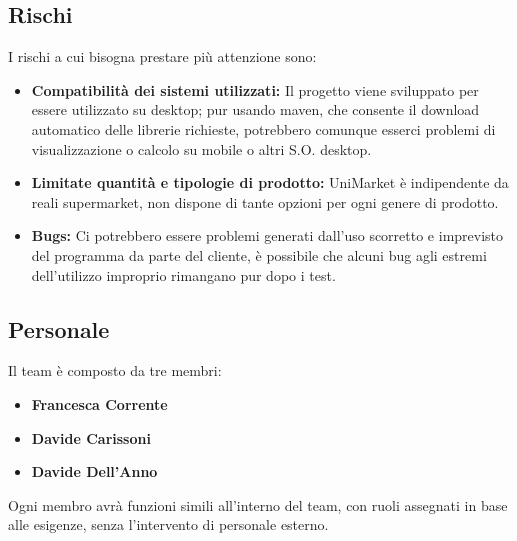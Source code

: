 \documentclass[a4paper,12pt]{article}
\begin{document}
\subsection{Rischi} %
I rischi a cui bisogna prestare più attenzione sono: 
\begin{itemize}
    \item \textbf{Compatibilità dei sistemi utilizzati:} 
    Il progetto viene sviluppato per essere utilizzato su desktop; pur usando maven, che consente il download automatico delle librerie richieste, potrebbero comunque esserci problemi di visualizzazione o calcolo su mobile o altri S.O. desktop. 
    \item \textbf{Limitate quantità e tipologie di prodotto:} 
    UniMarket è indipendente da reali supermarket, non dispone di tante opzioni per ogni genere di prodotto. 
    \item \textbf{Bugs:} 
    Ci potrebbero essere problemi generati dall’uso scorretto e imprevisto del programma da parte del cliente,
    è possibile che alcuni bug agli estremi dell’utilizzo improprio rimangano pur dopo i test. 
\end{itemize}

\subsection{Personale} %
Il team è composto da tre membri:\begin{itemize}
    \item \textbf{Francesca Corrente} 
    \item \textbf{Davide Carissoni} 
    \item \textbf{Davide Dell’Anno} 
\end{itemize}
Ogni membro avrà funzioni simili all’interno del team, con ruoli assegnati in base alle esigenze, senza l’intervento di personale esterno.
\end{document}

